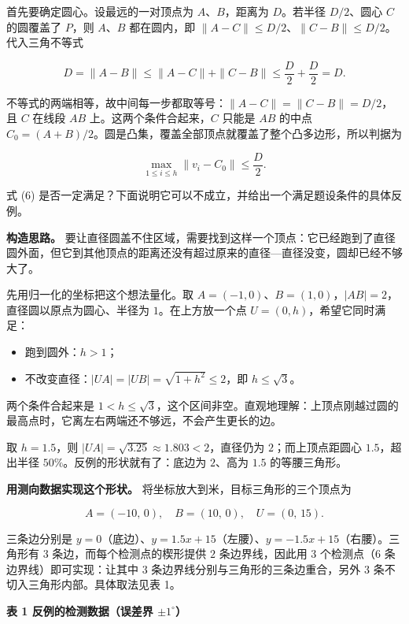 \documentclass[UTF8,a4paper,zihao=-4,fontset=fandol]{ctexart}
\begin{document}
首先要确定圆心。设最远的一对顶点为 $A$、$B$，距离为 $D$。若半径 $D/2$、圆心 $C$ 的圆覆盖了 $P$，则 $A$、$B$ 都在圆内，即 $\|A-C\|\le D/2$、$\|C-B\|\le D/2$。代入三角不等式

\[
D=\|A-B\|\le\|A-C\|+\|C-B\|\le\frac D2+\frac D2=D .
\]

不等式的两端相等，故中间每一步都取等号：$\|A-C\|=\|C-B\|=D/2$，且 $C$ 在线段 $AB$ 上。这两个条件合起来，$C$ 只能是 $AB$ 的中点 $C_0=(A+B)/2$。圆是凸集，覆盖全部顶点就覆盖了整个凸多边形，所以判据为

\[
\max_{1\le i\le h}\|v_i-C_0\|\le\frac D2 . \tag{6}
\]

式 (6) 是否一定满足？下面说明它可以不成立，并给出一个满足题设条件的具体反例。

\textbf{构造思路。} 要让直径圆盖不住区域，需要找到这样一个顶点：它已经跑到了直径圆外面，但它到其他顶点的距离还没有超过原来的直径---直径没变，圆却已经不够大了。

先用归一化的坐标把这个想法量化。取 $A=(-1,0)$、$B=(1,0)$，$|AB|=2$，直径圆以原点为圆心、半径为 $1$。在上方放一个点 $U=(0,h)$，希望它同时满足：

\begin{itemize}
\item 跑到圆外：$h>1$；
\item 不改变直径：$|UA|=|UB|=\sqrt{1+h^2}\le2$，即 $h\le\sqrt{3}$。
\end{itemize}

两个条件合起来是 $1<h\le\sqrt{3}$，这个区间非空。直观地理解：上顶点刚越过圆的最高点时，它离左右两端还不够远，不会产生更长的边。

取 $h=1.5$，则 $|UA|=\sqrt{3.25}\approx1.803<2$，直径仍为 $2$；而上顶点距圆心 $1.5$，超出半径 $50\%$。反例的形状就有了：底边为 $2$、高为 $1.5$ 的等腰三角形。

\textbf{用测向数据实现这个形状。} 将坐标放大到米，目标三角形的三个顶点为

\[
A=(-10,\,0),\quad B=(10,\,0),\quad U=(0,\,15).
\]

三条边分别是 $y=0$（底边）、$y=1.5x+15$（左腰）、$y=-1.5x+15$（右腰）。三角形有 $3$ 条边，而每个检测点的楔形提供 $2$ 条边界线，因此用 $3$ 个检测点（$6$ 条边界线）即可实现：让其中 $3$ 条边界线分别与三角形的三条边重合，另外 $3$ 条不切入三角形内部。具体取法见表 1。

\begin{center}
\textbf{表 1 反例的检测数据（误差界 $\pm1^\circ$）}
\end{center}
\end{document}
